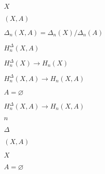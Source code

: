 \documentclass[10pt]{book}
\begin{document}
\begin{mdSnippets}
\begin{mdInlineSnippet}[02129bb861061d1a052c592e2dc6b383]
$X$\end{mdInlineSnippet}%
\begin{mdInlineSnippet}[88769d6fe468bd40568a9d4a1082131d]%
$(X,A)$\end{mdInlineSnippet}%
\begin{mdInlineSnippet}[826e698bb62f93de6d805b99dab0728a]%
$\Delta_n(X,A) = \Delta_n(X) / \Delta_n(A)$\end{mdInlineSnippet}%
\begin{mdInlineSnippet}[278347a1c1cc64ba0faef4cc9708143c]%
$H_n^\Delta(X,A)$\end{mdInlineSnippet}%
\begin{mdInlineSnippet}%
$H_n^\Delta(X) \to H_n(X)$\end{mdInlineSnippet}%
\begin{mdInlineSnippet}%
$H_n^\Delta(X,A) \to H_n(X,A)$\end{mdInlineSnippet}%
\begin{mdInlineSnippet}%
$A = \varnothing$\end{mdInlineSnippet}%
\begin{mdInlineSnippet}%
$H_n^\Delta(X,A) \to H_n(X,A)$\end{mdInlineSnippet}%
\begin{mdInlineSnippet}[7b8b965ad4bca0e41ab51de7b31363a1]%
$n$\end{mdInlineSnippet}%
\begin{mdInlineSnippet}[967878d1da852d4b07a961e3168b0fff]%
$\Delta$\end{mdInlineSnippet}%
\begin{mdInlineSnippet}[88769d6fe468bd40568a9d4a1082131d]%
$(X,A)$\end{mdInlineSnippet}%
\begin{mdInlineSnippet}[02129bb861061d1a052c592e2dc6b383]%
$X$\end{mdInlineSnippet}%
\begin{mdInlineSnippet}%
$A = \varnothing$\end{mdInlineSnippet}%
\begin{mdInlineSnippet}[fd221a37cf78ff3720cc2612be61dc45]%

\end{mdInlineSnippet}
\end{mdSnippets}
\end{document}
